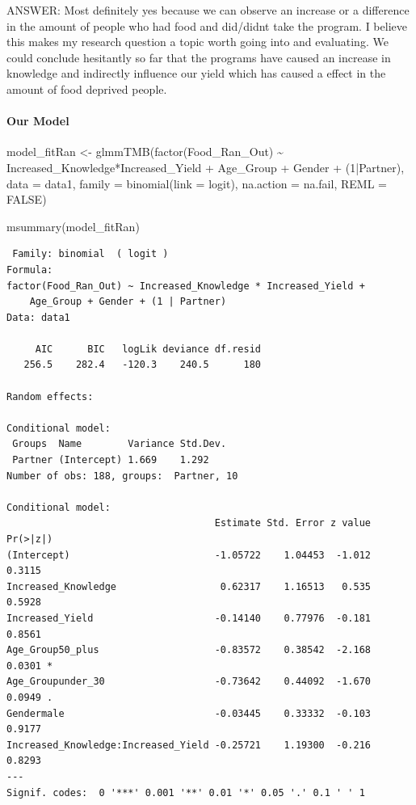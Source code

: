 \documentclass[
  letterpaper,
  DIV=11,
  numbers=noendperiod]{scrartcl}
\let\oldparagraph\paragraph
\renewcommand{\paragraph}[1]{\oldparagraph{#1}\mbox{}}
\newenvironment{Shaded}{\begin{snugshade}}{\end{snugshade}}
\newcommand{\AttributeTok}[1]{\textcolor[rgb]{0.40,0.45,0.13}{#1}}
\newcommand{\ConstantTok}[1]{\textcolor[rgb]{0.56,0.35,0.01}{#1}}
\newcommand{\DecValTok}[1]{\textcolor[rgb]{0.68,0.00,0.00}{#1}}
\newcommand{\FunctionTok}[1]{\textcolor[rgb]{0.28,0.35,0.67}{#1}}
\newcommand{\NormalTok}[1]{\textcolor[rgb]{0.00,0.23,0.31}{#1}}
\newcommand{\OtherTok}[1]{\textcolor[rgb]{0.00,0.23,0.31}{#1}}
\newcommand{\SpecialCharTok}[1]{\textcolor[rgb]{0.37,0.37,0.37}{#1}}
\newcommand{\StringTok}[1]{\textcolor[rgb]{0.13,0.47,0.30}{#1}}
\begin{document}
ANSWER: Most definitely yes because we can observe an increase or a
difference in the amount of people who had food and did/didnt take the
program. I believe this makes my research question a topic worth going
into and evaluating. We could conclude hesitantly so far that the
programs have caused an increase in knowledge and indirectly influence
our yield which has caused a effect in the amount of food deprived
people.

\hypertarget{our-model}{%
\paragraph{Our Model}\label{our-model}}

\begin{Shaded}
\begin{Highlighting}[]
\NormalTok{model\_fitRan }\OtherTok{\textless{}{-}} \FunctionTok{glmmTMB}\NormalTok{(}\FunctionTok{factor}\NormalTok{(Food\_Ran\_Out) }\SpecialCharTok{\textasciitilde{}}\NormalTok{ Increased\_Knowledge}\SpecialCharTok{*}\NormalTok{Increased\_Yield }\SpecialCharTok{+}\NormalTok{ Age\_Group }\SpecialCharTok{+}\NormalTok{ Gender }\SpecialCharTok{+}
\NormalTok{                  (}\DecValTok{1}\SpecialCharTok{|}\NormalTok{Partner), }
                 \AttributeTok{data =}\NormalTok{ data1, }
                 \AttributeTok{family =} \FunctionTok{binomial}\NormalTok{(}\AttributeTok{link =} \StringTok{\textquotesingle{}logit\textquotesingle{}}\NormalTok{),}
                 \AttributeTok{na.action =} \StringTok{\textquotesingle{}na.fail\textquotesingle{}}\NormalTok{,}
                 \AttributeTok{REML =} \ConstantTok{FALSE}\NormalTok{)}


\FunctionTok{msummary}\NormalTok{(model\_fitRan)}
\end{Highlighting}
\end{Shaded}

\begin{verbatim}
 Family: binomial  ( logit )
Formula:          
factor(Food_Ran_Out) ~ Increased_Knowledge * Increased_Yield +  
    Age_Group + Gender + (1 | Partner)
Data: data1

     AIC      BIC   logLik deviance df.resid 
   256.5    282.4   -120.3    240.5      180 

Random effects:

Conditional model:
 Groups  Name        Variance Std.Dev.
 Partner (Intercept) 1.669    1.292   
Number of obs: 188, groups:  Partner, 10

Conditional model:
                                    Estimate Std. Error z value Pr(>|z|)  
(Intercept)                         -1.05722    1.04453  -1.012   0.3115  
Increased_Knowledge                  0.62317    1.16513   0.535   0.5928  
Increased_Yield                     -0.14140    0.77976  -0.181   0.8561  
Age_Group50_plus                    -0.83572    0.38542  -2.168   0.0301 *
Age_Groupunder_30                   -0.73642    0.44092  -1.670   0.0949 .
Gendermale                          -0.03445    0.33332  -0.103   0.9177  
Increased_Knowledge:Increased_Yield -0.25721    1.19300  -0.216   0.8293  
---
Signif. codes:  0 '***' 0.001 '**' 0.01 '*' 0.05 '.' 0.1 ' ' 1
\end{verbatim}
\end{document}
